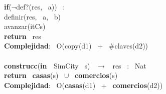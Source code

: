 \indent \indent \textbf{if}($\neg$def?(res, \ a)) \ :\\
\indent \indent \indent definir(res, \ a, \ b)\\
\indent \indent avanzar(itCs)\\
\indent \textbf{return} \ res\\
\textbf{Complejidad}: \ O(copy(d1) \ + \ $ \# $claves(d2))\\
\noindent\makebox[\linewidth]{\rule{\textwidth}{0.4pt}}
\\
\noindent\makebox[\linewidth]{\rule{\textwidth}{0.4pt}}
\textbf{construcc}(\textbf{in \ }SimCity \ s) \ $\rightarrow $ \ res \ : \ Nat\\
\indent \textbf{return} \ \textbf{casas}(s) \ $\cup$ \ \textbf{comercios}(s)\\
\textbf{Complejidad}: \ O(\textbf{casas}(d1) \ + \ \textbf{comercios}(d2))\\
\noindent\makebox[\linewidth]{\rule{\textwidth}{0.4pt}}
\\
\\
\\
